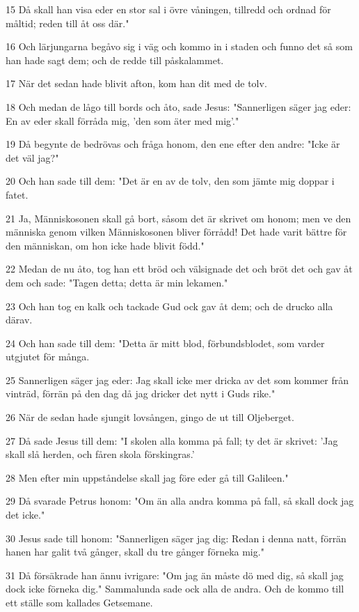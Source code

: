 \par 15 Då skall han visa eder en stor sal i övre våningen, tillredd och ordnad för måltid; reden till åt oss där."
\par 16 Och lärjungarna begåvo sig i väg och kommo in i staden och funno det så som han hade sagt dem; och de redde till påskalammet.
\par 17 När det sedan hade blivit afton, kom han dit med de tolv.
\par 18 Och medan de lågo till bords och åto, sade Jesus: "Sannerligen säger jag eder: En av eder skall förråda mig, 'den som äter med mig'."
\par 19 Då begynte de bedrövas och fråga honom, den ene efter den andre: "Icke är det väl jag?"
\par 20 Och han sade till dem: "Det är en av de tolv, den som jämte mig doppar i fatet.
\par 21 Ja, Människosonen skall gå bort, såsom det är skrivet om honom; men ve den människa genom vilken Människosonen bliver förrådd! Det hade varit bättre för den människan, om hon icke hade blivit född."
\par 22 Medan de nu åto, tog han ett bröd och välsignade det och bröt det och gav åt dem och sade: "Tagen detta; detta är min lekamen."
\par 23 Och han tog en kalk och tackade Gud ock gav åt dem; och de drucko alla därav.
\par 24 Och han sade till dem: "Detta är mitt blod, förbundsblodet, som varder utgjutet för många.
\par 25 Sannerligen säger jag eder: Jag skall icke mer dricka av det som kommer från vinträd, förrän på den dag då jag dricker det nytt i Guds rike."
\par 26 När de sedan hade sjungit lovsången, gingo de ut till Oljeberget.
\par 27 Då sade Jesus till dem: "I skolen alla komma på fall; ty det är skrivet: 'Jag skall slå herden, och fåren skola förskingras.'
\par 28 Men efter min uppståndelse skall jag före eder gå till Galileen."
\par 29 Då svarade Petrus honom: "Om än alla andra komma på fall, så skall dock jag det icke."
\par 30 Jesus sade till honom: "Sannerligen säger jag dig: Redan i denna natt, förrän hanen har galit två gånger, skall du tre gånger förneka mig."
\par 31 Då försäkrade han ännu ivrigare: "Om jag än måste dö med dig, så skall jag dock icke förneka dig." Sammalunda sade ock alla de andra. Och de kommo till ett ställe som kallades Getsemane.
